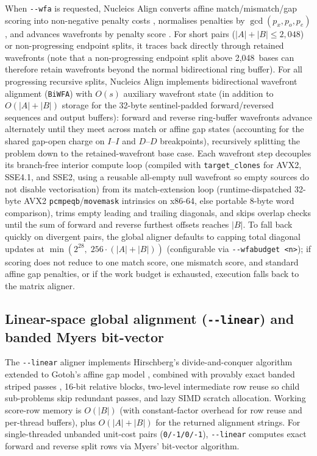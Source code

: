 \documentclass[11pt,a4paper]{article}
\begin{document}
When \texttt{-{}-wfa} is requested, Nucleics Align converts affine match/mismatch/gap scoring into non-negative penalty costs \citep{eizenga2022improving}, normalises penalties by $\gcd(p_x, p_o, p_e)$, and advances wavefronts by penalty score \citep{marcosola2021fast}. For short pairs ($|A| + |B| \le 2{,}048$) or non-progressing endpoint splits, it traces back directly through retained wavefronts (note that a non-progressing endpoint split above 2,048~bases can therefore retain wavefronts beyond the normal bidirectional ring buffer). For all progressing recursive splits, Nucleics Align implements bidirectional wavefront alignment (\texttt{BiWFA}) \citep{marcosola2023optimal} with $O(s)$ auxiliary wavefront state (in addition to $O(|A| + |B|)$ storage for the 32-byte sentinel-padded forward/reversed sequences and output buffers): forward and reverse ring-buffer wavefronts advance alternately until they meet across match or affine gap states (accounting for the shared gap-open charge on $I$--$I$ and $D$--$D$ breakpoints), recursively splitting the problem down to the retained-wavefront base case. Each wavefront step decouples its branch-free interior compute loop (compiled with \texttt{target\_clones} for AVX2, SSE4.1, and SSE2, using a reusable all-empty null wavefront so empty sources do not disable vectorisation) from its match-extension loop (runtime-dispatched 32-byte AVX2 \texttt{pcmpeqb}/\texttt{movemask} intrinsics on x86-64, else portable 8-byte word comparison), trims empty leading and trailing diagonals, and skips overlap checks until the sum of forward and reverse furthest offsets reaches $|B|$. To fall back quickly on divergent pairs, the global aligner defaults to capping total diagonal updates at $\min(2^{28},\; 256 \cdot (|A| + |B|))$ (configurable via \texttt{-{}-wfabudget <n>}); if scoring does not reduce to one match score, one mismatch score, and standard affine gap penalties, or if the work budget is exhausted, execution falls back to the matrix aligner.

\subsection{Linear-space global alignment (\texttt{-{}-linear}) and banded Myers bit-vector}

The \texttt{-{}-linear} aligner implements Hirschberg's divide-and-conquer algorithm \citep{hirschberg1975linear} extended to Gotoh's affine gap model \citep{myers1988optimal}, combined with provably exact banded striped passes \citep{chao1992aligning,farrar2007striped}, 16-bit relative blocks, two-level intermediate row reuse so child sub-problems skip redundant passes, and lazy SIMD scratch allocation. Working score-row memory is $O(|B|)$ (with constant-factor overhead for row reuse and per-thread buffers), plus $O(|A| + |B|)$ for the returned alignment strings. For single-threaded unbanded unit-cost pairs (\texttt{0/-1/0/-1}), \texttt{-{}-linear} computes exact forward and reverse split rows via Myers' bit-vector algorithm.
\end{document}
